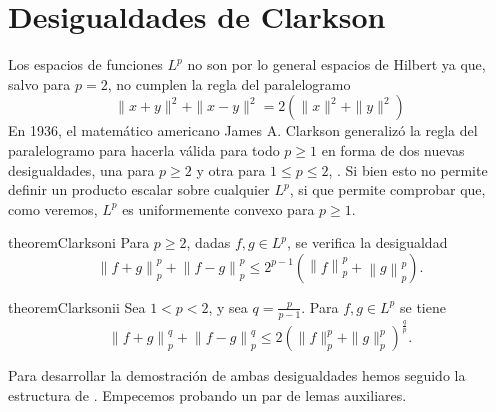 \section{Desigualdades de Clarkson}

Los espacios de funciones $ L^p $ no son por lo general espacios de Hilbert ya que, salvo para $ p = 2 $, no cumplen la regla del paralelogramo
\begin{equation}
    \| x + y \|^2 + \| x - y \|^2 = 2 \left( \| x \|^2 + \| y\|^2 \right)
\end{equation}
En 1936, el matemático americano James A. Clarkson generalizó la regla del paralelogramo para hacerla válida para todo $ p \geq 1 $ en forma de dos nuevas desigualdades, una para $p \geq 2 $ y otra para $ 1 \leq p \leq 2 $, \cite{clarkson}. Si bien esto no permite definir un producto escalar sobre cualquier $ L^p $, si que permite comprobar que, como veremos, $ L^p $ es uniformemente convexo para $ p \geq 1 $.

\begin{restatable}{theorem}{Clarksoni} \label{thm:clarkson-1}
    Para $ p \geq 2 $, dadas $ f, g \in L^p $, se verifica la desigualdad
    \begin{equation} \label{eq:clarkson-1}
        \left\| f+g \right\|_p^p + \left\| f-g \right\|_p^p \leq 2^{p-1} \left( \left\|f\right\|_p^p + \left\|g\right\|_p^p \right).
    \end{equation}
\end{restatable}

\begin{restatable}{theorem}{Clarksonii} \label{thm:clarkson-2}
    Sea $ 1 < p < 2 $, y sea $ q = \frac{p}{p-1}$. Para $ f, g \in L^p $ se tiene
    \begin{equation} \label{eq:clarkson-2}
        \left\| f + g \right\|_p^q + \left\| f - g \right\|_p^q \leq 2 \left(\|f \|_p^p + \|g\|_p^p \right)^{\frac{q}{p}}.
    \end{equation}
\end{restatable}

Para desarrollar la demostración de ambas desigualdades hemos seguido la estructura de \cite{hewitt}. Empecemos probando un par de lemas auxiliares.

